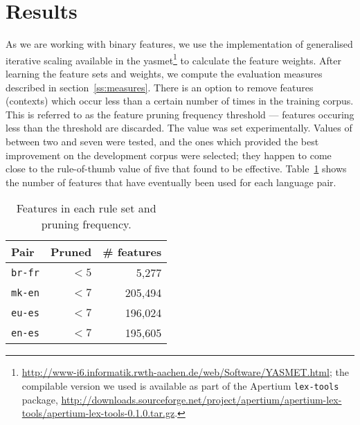 \documentclass[11pt]{article}
\begin{document}
\section{Results}
\label{sec:eval-ref-results}

As we are working with binary features, we use the implementation of
generalised iterative scaling available in the {\sc
  yasmet}\footnote{\url{http://www-i6.informatik.rwth-aachen.de/web/Software/YASMET.html};
  the compilable version we used is available as part of the Apertium
  \texttt{lex-tools} package,
  \url{http://downloads.sourceforge.net/project/apertium/apertium-lex-tools/apertium-lex-tools-0.1.0.tar.gz}.}
to calculate the feature weights.  After learning the feature sets and
weights, we compute the evaluation measures described in
section~\ref{ss:measures}. There is an option to remove features
(contexts) which occur
less than a certain number of times in the training corpus. This is
referred to as the feature pruning frequency threshold --- features
occuring less than the threshold are discarded. The value was set
experimentally. Values of between two and seven were tested, and the
ones which provided the best improvement on the development corpus
were selected; they happen to come close to the rule-of-thumb value of
five that \citet[p.~596]{Manning99b} found to be effective.
Table~\ref{table:maxent-features} shows the number of features that
have eventually been used for each language pair.


\begin{table}
 \begin{center}
    \begin{tabular}{|l|r|r|}
        \hline
        \textbf{Pair} & \textbf{Pruned} & \textbf{\# features} \\
        \hline
        {\tt br-fr}  & $< 5$              & 5,277    \\ 
        \hline
        {\tt mk-en} & $< 7$              & 205,494 \\ 
        \hline
        {\tt eu-es} & $< 7$              & 196,024\\
        \hline
        {\tt en-es} & $< 7$              & 195,605\\
        \hline
    \end{tabular}
 \end{center}
 \caption{Features in each rule set and pruning frequency.}
 \label{table:maxent-features}
\end{table}
\end{document}

